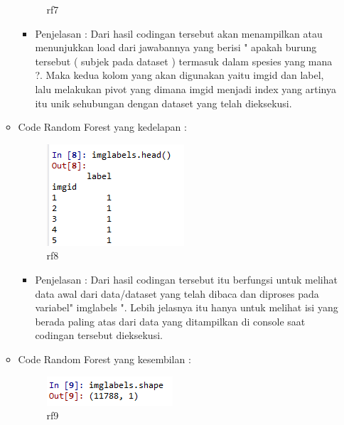 \begin{enumerate}
\begin{itemize}
\begin{figure}[ht]
\caption{rf7}
\label{contoh}
\end{figure}
\par
\begin{itemize}
\item Penjelasan : Dari hasil codingan tersebut akan menampilkan atau menunjukkan load dari jawabannya yang berisi " apakah burung tersebut ( subjek pada dataset ) termasuk dalam spesies yang mana ?. Maka kedua kolom yang akan digunakan yaitu imgid dan label, lalu melakukan pivot yang dimana imgid menjadi index yang artinya itu unik sehubungan dengan dataset yang telah dieksekusi.
\par
\par
\end{itemize}
\item Code Random Forest yang kedelapan :
\par
\begin{figure}[ht]
\centering
\includegraphics[scale=0.2]{figures/rf8.png}
\caption{rf8}
\label{contoh}
\end{figure}
\par
\begin{itemize}
\item Penjelasan : Dari hasil codingan tersebut itu berfungsi untuk melihat data awal dari data/dataset yang telah dibaca dan diproses pada variabel" imglabels ". Lebih jelasnya itu hanya untuk melihat isi yang berada paling atas dari data yang ditampilkan di console saat codingan tersebut dieksekusi.
\par
\par
\end{itemize}
\item Code Random Forest yang kesembilan :
\par
\begin{figure}[ht]
\centering
\includegraphics[scale=0.2]{figures/rf9.png}
\caption{rf9}
\label{contoh}
\end{figure}
\par

\end{itemize}
\end{enumerate}
